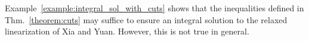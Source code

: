 Example~\ref{example:integral_sol_with_cuts} shows that the inequalities defined in Thm.~\ref{theorem:cuts} may suffice to ensure an integral solution to the relaxed linearization of Xia and Yuan. However, this is not true in general.


